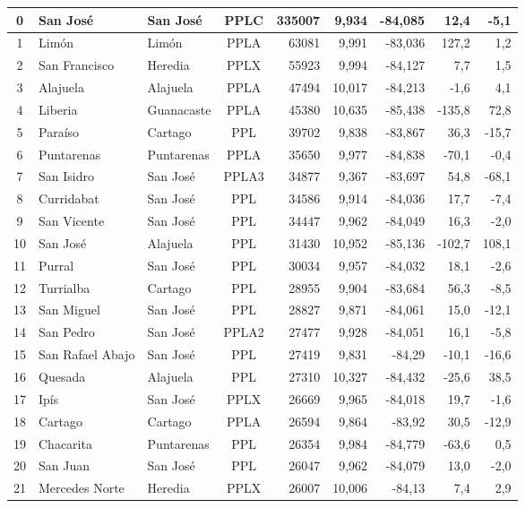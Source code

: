 \begin{longtable}{|c|l|l|c|r|r|r|r|r|}
0 & San José & San José & PPLC & 335007 & 9,934 & -84,085 & 12,4 & -5,1 \\ \hline
1 & Limón & Limón & PPLA & 63081 & 9,991 & -83,036 & 127,2 & 1,2 \\ \hline
2 & San Francisco & Heredia & PPLX & 55923 & 9,994 & -84,127 & 7,7 & 1,5 \\ \hline
3 & Alajuela & Alajuela & PPLA & 47494 & 10,017 & -84,213 & -1,6 & 4,1 \\ \hline
4 & Liberia & Guanacaste & PPLA & 45380 & 10,635 & -85,438 & -135,8 & 72,8 \\ \hline
5 & Paraíso & Cartago & PPL & 39702 & 9,838 & -83,867 & 36,3 & -15,7 \\ \hline
6 & Puntarenas & Puntarenas & PPLA & 35650 & 9,977 & -84,838 & -70,1 & -0,4 \\ \hline
7 & San Isidro & San José & PPLA3 & 34877 & 9,367 & -83,697 & 54,8 & -68,1 \\ \hline
8 & Curridabat & San José & PPL & 34586 & 9,914 & -84,036 & 17,7 & -7,4 \\ \hline
9 & San Vicente & San José & PPL & 34447 & 9,962 & -84,049 & 16,3 & -2,0 \\ \hline
10 & San José & Alajuela & PPL & 31430 & 10,952 & -85,136 & -102,7 & 108,1 \\ \hline
11 & Purral & San José & PPL & 30034 & 9,957 & -84,032 & 18,1 & -2,6 \\ \hline
12 & Turrialba & Cartago & PPL & 28955 & 9,904 & -83,684 & 56,3 & -8,5 \\ \hline
13 & San Miguel & San José & PPL & 28827 & 9,871 & -84,061 & 15,0 & -12,1 \\ \hline
14 & San Pedro & San José & PPLA2 & 27477 & 9,928 & -84,051 & 16,1 & -5,8 \\ \hline
15 & San Rafael Abajo & San José & PPL & 27419 & 9,831 & -84,29 & -10,1 & -16,6 \\ \hline
16 & Quesada & Alajuela & PPL & 27310 & 10,327 & -84,432 & -25,6 & 38,5 \\ \hline
17 & Ipís & San José & PPLX & 26669 & 9,965 & -84,018 & 19,7 & -1,6 \\ \hline
18 & Cartago & Cartago & PPLA & 26594 & 9,864 & -83,92 & 30,5 & -12,9 \\ \hline
19 & Chacarita & Puntarenas & PPL & 26354 & 9,984 & -84,779 & -63,6 & 0,5 \\ \hline
20 & San Juan & San José & PPL & 26047 & 9,962 & -84,079 & 13,0 & -2,0 \\ \hline
21 & Mercedes Norte & Heredia & PPLX & 26007 & 10,006 & -84,13 & 7,4 & 2,9 \\ \hline

\end{longtable}
